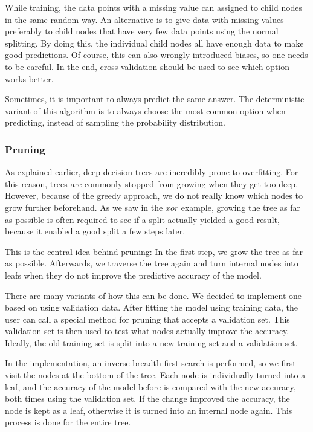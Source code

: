 \documentclass[a4paper]{article}
\begin{document}
While training, the data points with a missing value can assigned to child nodes in the same random way. An alternative is to give data with missing values preferably to child nodes that have very few data points using the normal splitting. By doing this, the individual child nodes all have enough data to make good predictions. Of course, this can also wrongly introduced biases, so one needs to be careful. In the end, cross validation should be used to see which option works better.

Sometimes, it is important to always predict the same answer. The deterministic variant of this algorithm is to always choose the most common option when predicting, instead of sampling the probability distribution.

\subsubsection{Pruning}
\label{subsec:c45-pruning}

As explained earlier, deep decision trees are incredibly prone to overfitting. For this reason, trees are commonly stopped from growing when they get too deep. However, because of the greedy approach, we do not really know which nodes to grow further beforehand. As we saw in the $\mathit{xor}$ example, growing the tree as far as possible is often required to see if a split actually yielded a good result, because it enabled a good split a few steps later.

This is the central idea behind pruning: In the first step, we grow the tree as far as possible. Afterwards, we traverse the tree again and turn internal nodes into leafs when they do not improve the predictive accuracy of the model.

There are many variants of how this can be done. We decided to implement one based on using validation data. After fitting the model using training data, the user can call a special method for pruning that accepts a validation set. This validation set is then used to test what nodes actually improve the accuracy. Ideally, the old training set is split into a new training set and a validation set.

In the implementation, an inverse breadth-first search is performed, so we first visit the nodes at the bottom of the tree. Each node is individually turned into a leaf, and the accuracy of the model before is compared with the new accuracy, both times using the validation set. If the change improved the accuracy, the node is kept as a leaf, otherwise it is turned into an internal node again. This process is done for the entire tree.
\end{document}
